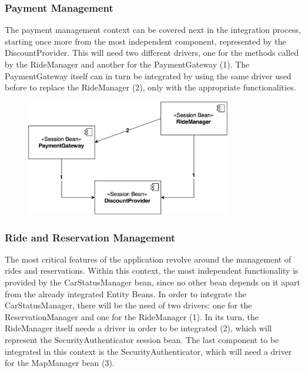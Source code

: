 \subsubsection{Payment Management}
The payment management context can be covered next in the integration process, starting once more from the most independent component, represented by the DiscountProvider. This will need two different drivers, one for the methods called by the RideManager and another for the PaymentGateway (1).
\noindent
The PaymentGateway itself can in turn be integrated by using the same driver used before to replace the RideManager (2), only with the appropriate functionalities.

\begin{figure}[H]
\begin{center}
		\includegraphics[width=0.8\textwidth]{./integration_strategy/diagrams/payment.png}
\end{center}
\end{figure}


\subsubsection{Ride and Reservation Management}
The most critical features of the application revolve around the management of rides and reservations. Within this context, the most independent functionality is provided by the CarStatusManager bean, since no other bean depends on it apart from the already integrated Entity Beans. In order to integrate the CarStatusManager, there will be the need of two drivers: one for the ReservationManager and one for the RideManager (1).
\noindent
In its turn, the RideManager itself needs a driver in order to be integrated (2), which will represent the SecurityAuthenticator session bean.
\noindent
The last component to be integrated in this context is the SecurityAuthenticator, which will need a driver for the MapManager bean (3).


